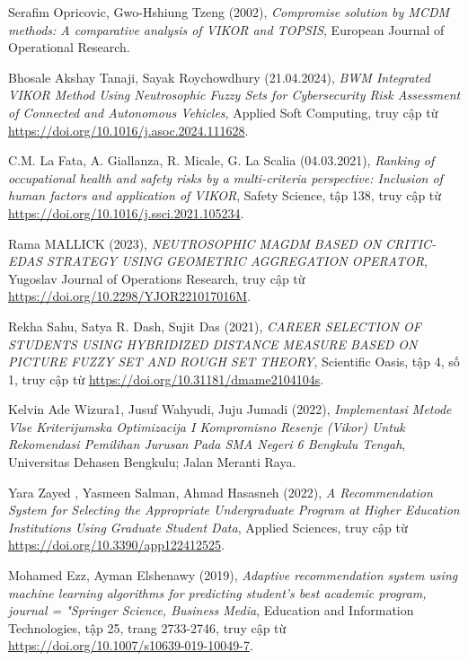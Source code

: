 \begin{thebibliography}{99}
    Serafim Opricovic, Gwo-Hshiung Tzeng (2002),
    \emph{Compromise solution by MCDM methods: A comparative analysis of VIKOR and TOPSIS},
    European Journal of Operational Research.

    Bhosale Akshay Tanaji, Sayak Roychowdhury (21.04.2024),
    \emph{BWM Integrated VIKOR Method Using Neutrosophic Fuzzy Sets for Cybersecurity Risk Assessment of Connected and Autonomous Vehicles},
    Applied Soft Computing,
    truy cập từ \href{https://doi.org/10.1016/j.asoc.2024.111628}{\color{black}https://doi.org/10.1016/j.asoc.2024.111628}.

    C.M. La Fata, A. Giallanza, R. Micale, G. La Scalia (04.03.2021),
    \emph{Ranking of occupational health and safety risks by a multi-criteria perspective: Inclusion of human factors and application of VIKOR},
    Safety Science,
    tập 138,
    truy cập từ \href{https://doi.org/10.1016/j.ssci.2021.105234}{\color{black}https://doi.org/10.1016/j.ssci.2021.105234}.

    Rama MALLICK (2023),
    \emph{NEUTROSOPHIC MAGDM BASED ON CRITIC-EDAS STRATEGY USING GEOMETRIC AGGREGATION OPERATOR},
    Yugoslav Journal of Operations Research,
    truy cập từ \href{https://doi.org/10.2298/YJOR221017016M}{\color{black}https://doi.org/10.2298/YJOR221017016M}.

    Rekha Sahu, Satya R. Dash, Sujit Das (2021),
    \emph{CAREER SELECTION OF STUDENTS USING HYBRIDIZED DISTANCE MEASURE BASED ON PICTURE FUZZY SET AND ROUGH SET THEORY},
    Scientific Oasis,
    tập 4, số 1,
    truy cập từ \href{https://doi.org/10.31181/dmame2104104s}{\color{black}https://doi.org/10.31181/dmame2104104s}.

    Kelvin Ade Wizura1, Jusuf Wahyudi, Juju Jumadi (2022),
    \emph{Implementasi Metode Vlse Kriterijumska Optimizacija I Kompromisno Resenje (Vikor) Untuk Rekomendasi Pemilihan Jurusan Pada SMA Negeri 6 Bengkulu Tengah},
    Universitas Dehasen Bengkulu; Jalan Meranti Raya.

    Yara Zayed , Yasmeen Salman, Ahmad Hasasneh (2022),
    \emph{A Recommendation System for Selecting the Appropriate Undergraduate Program at Higher Education Institutions Using Graduate Student Data},
    Applied Sciences,
    truy cập từ \href{https://doi.org/10.3390/app122412525}{\color{black}https://doi.org/10.3390/app122412525}.

    Mohamed Ezz, Ayman Elshenawy (2019),
    \emph{Adaptive recommendation system using machine learning algorithms for predicting student’s best academic program,
    journal = "Springer Science, Business Media},
    Education and Information Technologies,
    tập 25, trang 2733-2746,
    truy cập từ \href{https://doi.org/10.1007/s10639-019-10049-7}{\color{black}https://doi.org/10.1007/s10639-019-10049-7}.


\end{thebibliography}
